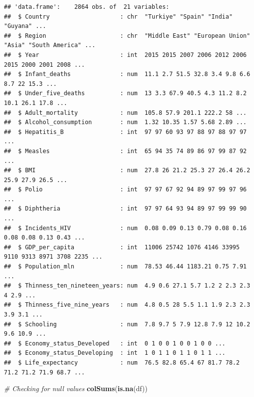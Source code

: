 \documentclass[
  10pt,
]{article}
\newenvironment{Shaded}{\begin{snugshade}}{\end{snugshade}}
\newcommand{\CommentTok}[1]{\textcolor[rgb]{0.56,0.35,0.01}{\textit{#1}}}
\newcommand{\FunctionTok}[1]{\textcolor[rgb]{0.13,0.29,0.53}{\textbf{#1}}}
\newcommand{\NormalTok}[1]{#1}
\begin{document}
\begin{verbatim}
## 'data.frame':    2864 obs. of  21 variables:
##  $ Country                    : chr  "Turkiye" "Spain" "India" "Guyana" ...
##  $ Region                     : chr  "Middle East" "European Union" "Asia" "South America" ...
##  $ Year                       : int  2015 2015 2007 2006 2012 2006 2015 2000 2001 2008 ...
##  $ Infant_deaths              : num  11.1 2.7 51.5 32.8 3.4 9.8 6.6 8.7 22 15.3 ...
##  $ Under_five_deaths          : num  13 3.3 67.9 40.5 4.3 11.2 8.2 10.1 26.1 17.8 ...
##  $ Adult_mortality            : num  105.8 57.9 201.1 222.2 58 ...
##  $ Alcohol_consumption        : num  1.32 10.35 1.57 5.68 2.89 ...
##  $ Hepatitis_B                : int  97 97 60 93 97 88 97 88 97 97 ...
##  $ Measles                    : int  65 94 35 74 89 86 97 99 87 92 ...
##  $ BMI                        : num  27.8 26 21.2 25.3 27 26.4 26.2 25.9 27.9 26.5 ...
##  $ Polio                      : int  97 97 67 92 94 89 97 99 97 96 ...
##  $ Diphtheria                 : int  97 97 64 93 94 89 97 99 99 90 ...
##  $ Incidents_HIV              : num  0.08 0.09 0.13 0.79 0.08 0.16 0.08 0.08 0.13 0.43 ...
##  $ GDP_per_capita             : int  11006 25742 1076 4146 33995 9110 9313 8971 3708 2235 ...
##  $ Population_mln             : num  78.53 46.44 1183.21 0.75 7.91 ...
##  $ Thinness_ten_nineteen_years: num  4.9 0.6 27.1 5.7 1.2 2 2.3 2.3 4 2.9 ...
##  $ Thinness_five_nine_years   : num  4.8 0.5 28 5.5 1.1 1.9 2.3 2.3 3.9 3.1 ...
##  $ Schooling                  : num  7.8 9.7 5 7.9 12.8 7.9 12 10.2 9.6 10.9 ...
##  $ Economy_status_Developed   : int  0 1 0 0 1 0 0 1 0 0 ...
##  $ Economy_status_Developing  : int  1 0 1 1 0 1 1 0 1 1 ...
##  $ Life_expectancy            : num  76.5 82.8 65.4 67 81.7 78.2 71.2 71.2 71.9 68.7 ...
\end{verbatim}

\begin{Shaded}
\begin{Highlighting}[]
\CommentTok{\# Checking for null values}
\FunctionTok{colSums}\NormalTok{(}\FunctionTok{is.na}\NormalTok{(df))}
\end{Highlighting}
\end{Shaded}
\end{document}
